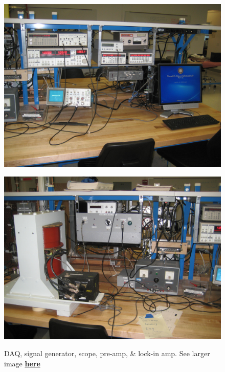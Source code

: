 \documentclass{../lab}
\begin{document}
\begin{figure}[H]
\begin{minipage}{0.32\textwidth}
    \href{http://experimentationlab.berkeley.edu/sites/default/files/images/NMR_Exp_3496.jpg}{\includegraphics[width=\linewidth,keepaspectratio]{images/NMR_Exp_3496.jpg}}
    \caption{DAQ, signal generator, scope, pre-amp, \& lock-in amp. See larger image \href{http://experimentationlab.berkeley.edu/sites/default/files/images/NMR_Exp_3496.jpg}{\textbf{here}}}
\end{minipage}
\begin{minipage}{0.32\textwidth}
    \href{http://experimentationlab.berkeley.edu/sites/default/files/images/NMR_Exp_3557.jpg}{\includegraphics[width=\linewidth,keepaspectratio]{images/NMR_Exp_3557.jpg}}

\end{minipage}
\end{figure}
\end{document}
